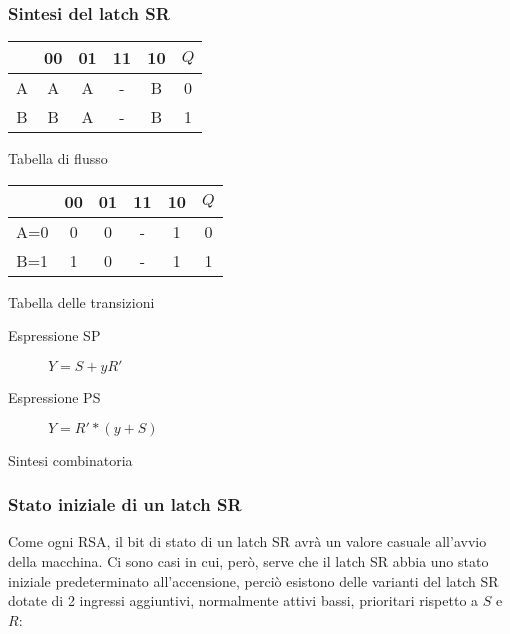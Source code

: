 \documentclass{subfiles}
\begin{document}
\subsubsection{Sintesi del latch SR}

\begin{center}
\begin{multicols}{2}
\begin{tabular}{ |c|c|c|c|c|c| }
\hline
& 00 & 01 & 11 & 10 & $Q$ \\
\hline
\hline
A & A & A & - & B & 0 \\
B & B & A & - & B & 1 \\
\hline
\end{tabular}

Tabella di flusso
\end{multicols}

\begin{multicols}{2}
\begin{tabular}{ |c|c|c|c|c|c| }
\hline
& 00 & 01 & 11 & 10 & $Q$ \\
\hline
\hline
A=0 & 0 & 0 & - & 1 & 0 \\
B=1 & 1 & 0 & - & 1 & 1 \\
\hline
\end{tabular}

Tabella delle transizioni
\end{multicols}

\begin{multicols}{2}
\begin{description}
\item[Espressione SP] $Y = S + yR'$
\item[Espressione PS] $Y = R' * (y+S)$
\end{description}

Sintesi combinatoria
\end{multicols}
\end{center}

\subsubsection{Stato iniziale di un latch SR}

Come ogni RSA, il bit di stato di un latch SR avrà un valore casuale all'avvio della macchina.
Ci sono casi in cui, però, serve che il latch SR abbia uno stato iniziale predeterminato all'accensione, perciò esistono delle varianti del latch SR dotate di 2 ingressi aggiuntivi, normalmente attivi bassi, prioritari rispetto a $S$ e $R$:
\end{document}
